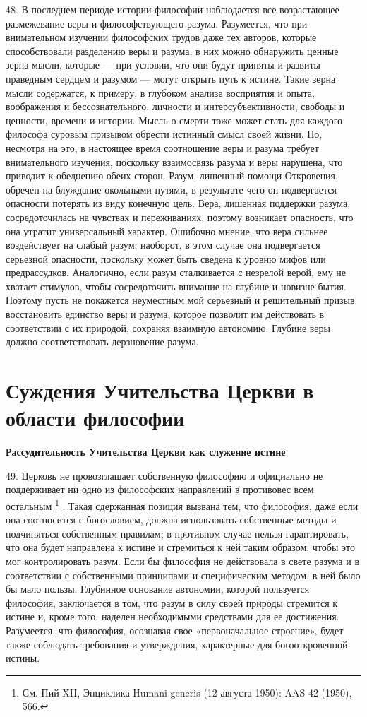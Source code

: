 \documentclass[a5paper,10pt]{article}
\begin{document}
48. В последнем периоде истории философии наблюдается все возрастающее
размежевание веры и философствующего разума. Разумеется, что при внимательном
изучении философских трудов даже тех авторов, которые способствовали разделению
веры и разума, в них можно обнаружить ценные зерна мысли, которые — при
условии, что они будут приняты и развиты праведным сердцем и разумом — могут
открыть путь к истине. Такие зерна мысли содержатся, к примеру, в глубоком
анализе восприятия и опыта, воображения и бессознательного, личности и
интерсубъективности, свободы и ценности, времени и истории. Мысль о смерти тоже
может стать для каждого философа суровым призывом обрести истинный смысл своей
жизни. Но, несмотря на это, в настоящее время соотношение веры и разума требует
внимательного изучения, поскольку взаимосвязь разума и веры нарушена, что
приводит к обеднению обеих сторон. Разум, лишенный помощи Откровения, обречен
на блуждание окольными путями, в результате чего он подвергается опасности
потерять из виду конечную цель. Вера, лишенная поддержки разума,
сосредоточилась на чувствах и переживаниях, поэтому возникает опасность, что
она утратит универсальный характер. Ошибочно мнение, что вера сильнее
воздействует на слабый разум; наоборот, в этом случае она подвергается
серьезной опасности, поскольку может быть сведена к уровню мифов или
предрассудков.  Аналогично, если разум сталкивается с незрелой верой, ему не
хватает стимулов, чтобы сосредоточить внимание на глубине и новизне бытия.
Поэтому пусть не покажется неуместным мой серьезный и решительный призыв
восстановить единство веры и разума, которое позволит им действовать в
соответствии с их природой, сохраняя взаимную автономию. Глубине веры должно
соответствовать дерзновение разума.

\section{Суждения Учительства Церкви в области философии}

\textbf{Рассудительность Учительства Церкви как служение истине }

49. Церковь не провозглашает собственную философию и официально не поддерживает
ни одно из философских направлений в противовес всем остальным \footnote{См.
Пий XII, Энциклика Humani generis (12 августа 1950): AAS 42 (1950), 566.}  .
Такая сдержанная позиция вызвана тем, что философия, даже если она соотносится
с богословием, должна использовать собственные методы и подчиняться собственным
правилам; в противном случае нельзя гарантировать, что она будет направлена к
истине и стремиться к ней таким образом, чтобы это мог контролировать разум.
Если бы философия не действовала в свете разума и в соответствии с собственными
принципами и специфическим методом, в ней было бы мало пользы. Глубинное
основание автономии, которой пользуется философия, заключается в том, что разум
в силу своей природы стремится к истине и, кроме того, наделен необходимыми
средствами для ее достижения. Разумеется, что философия, осознавая свое
«первоначальное строение», будет также соблюдать требования и утверждения,
характерные для богооткровенной истины.
\end{document}
